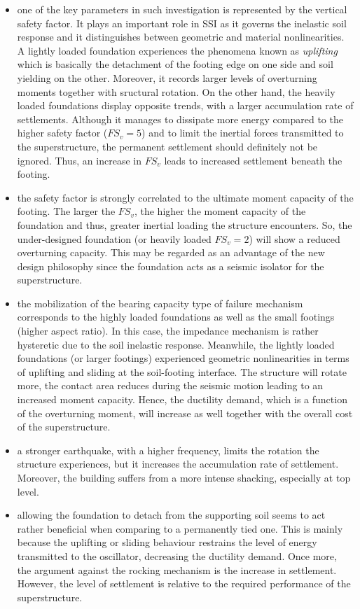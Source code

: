 \begin{itemize} 
	\item one of the key parameters in such investigation is represented by the vertical safety factor. It plays an important role in SSI as it governs the inelastic soil response and it distinguishes between geometric and material nonlinearities. A lightly loaded foundation experiences the phenomena known as \textit{uplifting} which is basically the detachment of the footing edge on one side and soil yielding on the other. Moreover, it records larger levels of overturning moments together with sructural rotation. On the other hand, the heavily loaded foundations display opposite trends, with a larger accumulation rate of settlements. Although it manages to dissipate more energy compared to the higher safety factor ($FS_v=5$) and to limit the inertial forces transmitted to the superstructure, the permanent settlement should definitely not be ignored. Thus, an increase in $FS_v$ leads to increased settlement beneath the footing.
	\item the safety factor is strongly correlated to the ultimate moment capacity of the footing. The larger the $FS_v$, the higher the moment capacity of the foundation and thus, greater inertial loading the structure encounters. So, the under-designed foundation (or heavily loaded $FS_v=2$) will show a reduced overturning capacity. This may be regarded as an advantage of the new design philosophy since the foundation acts as a seismic isolator for the superstructure.
	\item the mobilization of the bearing capacity type of failure mechanism corresponds to the highly loaded foundations as well as the small footings (higher aspect ratio). In this case, the impedance mechanism is rather hysteretic due to the soil inelastic response. Meanwhile, the lightly loaded foundations (or larger footings) experienced geometric nonlinearities in terms of uplifting and sliding at the soil-footing interface. The structure will rotate more, the contact area reduces during the seismic motion leading to an increased moment capacity. Hence, the ductility demand, which is a function of the overturning moment, will increase as well together with the overall cost of the superstructure.
	\item a stronger earthquake, with a higher frequency, limits the rotation the structure experiences, but it increases the accumulation rate of settlement. Moreover, the building suffers from a more intense shacking, especially at top level. 
	\item allowing the foundation to detach from the supporting soil seems to act rather beneficial when comparing to a permanently tied one. This is mainly because the uplifting or sliding behaviour restrains the level of energy transmitted to the oscillator, decreasing the ductility demand. Once more, the argument against the rocking mechanism is the increase in settlement. However, the level of settlement is relative to the required performance of the superstructure.

\end{itemize}

